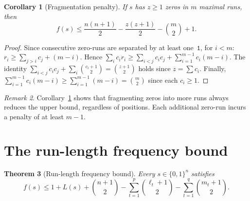 \documentclass[11pt,a4paper]{article}
\theoremstyle{plain}
\newtheorem{theorem}{Theorem}[section]
\newtheorem{corollary}[theorem]{Corollary}
\theoremstyle{definition}
\theoremstyle{remark}
\newtheorem{remark}[theorem]{Remark}
\begin{document}
\begin{corollary}[Fragmentation penalty]\label{cor:fragment}
  If $s$ has $z \ge 1$ zeros in $m$ maximal runs, then
  \[
    f(s) \le \frac{n(n{+}1)}{2} - \frac{z(z{+}1)}{2} - \binom{m}{2} + 1.
  \]
\end{corollary}

\begin{proof}
  Since consecutive zero-runs are separated by at least
  one~$\mathtt{1}$, for $i < m$:
  $r_i \ge \sum_{j>i} c_j + (m - i)$.  Hence
  $\sum_i c_i r_i \ge \sum_{i<j} c_i c_j + \sum_{i=1}^{m-1} c_i(m{-}i)$.
  The identity
  $\sum_{i<j} c_i c_j + \sum_i \binom{c_i{+}1}{2} = \binom{z{+}1}{2}$
  holds since $z = \sum c_i$.
  Finally, $\sum_{i=1}^{m-1} c_i(m{-}i) \ge \sum_{i=1}^{m-1}(m{-}i)
  = \binom{m}{2}$ since each $c_i \ge 1$.
\end{proof}

\begin{remark}
  Corollary~\ref{cor:fragment} shows that fragmenting zeros into more
  runs always reduces the upper bound, regardless of positions.
  Each additional zero-run incurs a penalty of at least $m - 1$.
\end{remark}

\section{The run-length frequency bound}\label{sec:rlf}

\begin{theorem}[Run-length frequency bound]\label{thm:rlf}
  Every $s \in \{0,1\}^n$ satisfies
  \begin{equation}\label{eq:rlf}
    f(s) \le 1 + L(s) + \binom{n{+}1}{2}
      - \sum_{t=1}^p \binom{\ell_t{+}1}{2}
      - \sum_{t=1}^q \binom{m_t{+}1}{2}.
  \end{equation}
\end{theorem}
\end{document}

